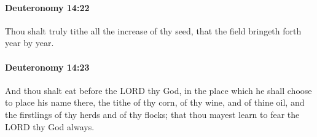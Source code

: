 		\paragraph{Deuteronomy 14:22} %
			\label{DEUTERONOMY-14-22}

			Thou shalt truly tithe all the increase of thy seed, that the field bringeth forth year by year.


		\paragraph{Deuteronomy 14:23} %
			\label{DEUTERONOMY-14-23}

			And thou shalt eat before the LORD thy God, in the place which he shall choose to place his name there, the tithe of thy corn, of thy wine, and of thine oil, and the firstlings of thy herds and of thy flocks; that thou mayest learn to fear the LORD thy God always.

